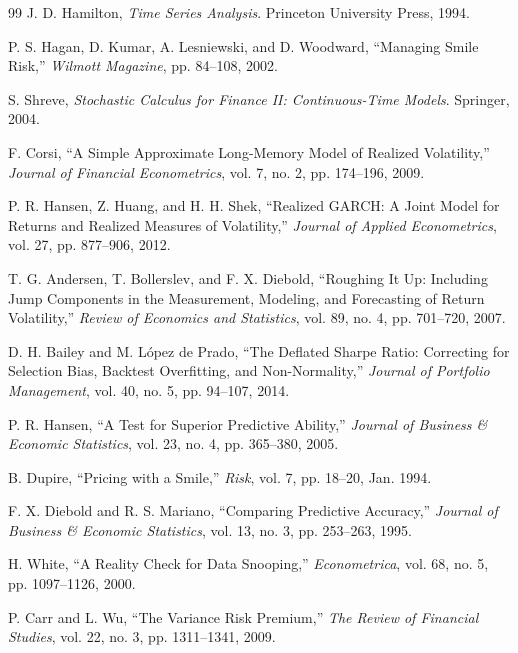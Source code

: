 \documentclass[journal]{IEEEtran}
\begin{document}
\begin{thebibliography}{99}
J. D. Hamilton, \emph{Time Series Analysis}. Princeton University Press, 1994.

P. S. Hagan, D. Kumar, A. Lesniewski, and D. Woodward, ``Managing Smile Risk,'' \emph{Wilmott Magazine}, pp. 84--108, 2002.

S. Shreve, \emph{Stochastic Calculus for Finance II: Continuous-Time Models}. Springer, 2004.

F. Corsi, ``A Simple Approximate Long-Memory Model of Realized Volatility,'' \emph{Journal of Financial Econometrics}, vol. 7, no. 2, pp. 174--196, 2009.

P. R. Hansen, Z. Huang, and H. H. Shek, ``Realized GARCH: A Joint Model for Returns and Realized Measures of Volatility,'' \emph{Journal of Applied Econometrics}, vol. 27, pp. 877--906, 2012.

T. G. Andersen, T. Bollerslev, and F. X. Diebold, ``Roughing It Up: Including Jump Components in the Measurement, Modeling, and Forecasting of Return Volatility,'' \emph{Review of Economics and Statistics}, vol. 89, no. 4, pp. 701--720, 2007.

D. H. Bailey and M. López de Prado, ``The Deflated Sharpe Ratio: Correcting for Selection Bias, Backtest Overfitting, and Non-Normality,'' \emph{Journal of Portfolio Management}, vol. 40, no. 5, pp. 94--107, 2014.

P. R. Hansen, ``A Test for Superior Predictive Ability,'' \emph{Journal of Business \& Economic Statistics}, vol. 23, no. 4, pp. 365--380, 2005.

B. Dupire, ``Pricing with a Smile,'' \emph{Risk}, vol. 7, pp. 18--20, Jan. 1994.

F. X. Diebold and R. S. Mariano, ``Comparing Predictive Accuracy,'' \emph{Journal of Business \& Economic Statistics}, vol. 13, no. 3, pp. 253--263, 1995.

H. White, ``A Reality Check for Data Snooping,'' \emph{Econometrica}, vol. 68, no. 5, pp. 1097--1126, 2000.

P. Carr and L. Wu, ``The Variance Risk Premium,'' \emph{The Review of Financial Studies}, vol. 22, no. 3, pp. 1311--1341, 2009.

\end{thebibliography}
\end{document}
